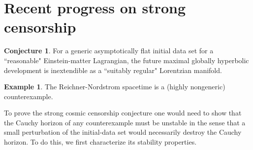 \documentclass[12pt]{report}
\theoremstyle{definition}
\newtheorem{conjecture}[theorem]{Conjecture}
\newtheorem{example}[theorem]{Example}
\begin{document}
\section{Recent progress on strong censorship}
\begin{conjecture}
    For a generic asymptotically flat initial data set for a ``reasonable" Einstein-matter Lagrangian, the future maximal globally hyperbolic development is inextendible as a ``suitably regular" Lorentzian manifold.
\end{conjecture}
\begin{example}
    The Reichner-Nordstrom spacetime is a (highly nongeneric) counterexample.
\end{example}
    To prove the strong cosmic censorship conjecture one would need to show that the Cauchy horizon of any counterexample must be unstable in the sense that a small perturbation of the initial-data set would necessarily destroy the Cauchy horizon. To do this, we first characterize its stability properties.
\end{document}
